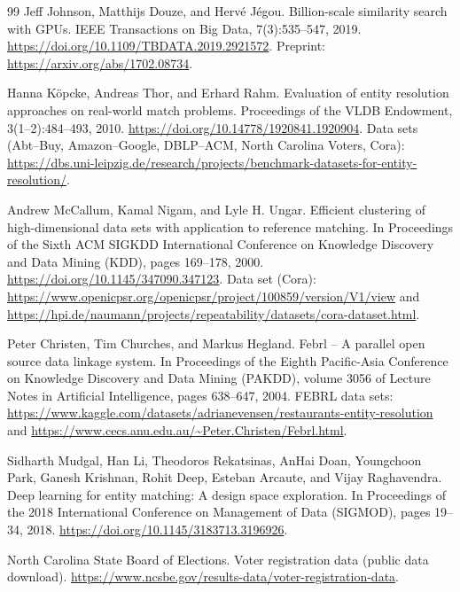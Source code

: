 \documentclass[conference]{IEEEtran}
\begin{document}
\begin{thebibliography}{99}
Jeff Johnson, Matthijs Douze, and Herv\'e J\'egou.
\newblock Billion-scale similarity search with GPUs.
\newblock IEEE Transactions on Big Data, 7(3):535--547, 2019.
\newblock \url{https://doi.org/10.1109/TBDATA.2019.2921572}.
\newblock Preprint: \url{https://arxiv.org/abs/1702.08734}.

Hanna K\"opcke, Andreas Thor, and Erhard Rahm.
\newblock Evaluation of entity resolution approaches on real-world match problems.
\newblock Proceedings of the VLDB Endowment, 3(1--2):484--493, 2010.
\newblock \url{https://doi.org/10.14778/1920841.1920904}.
\newblock Data sets (Abt--Buy, Amazon--Google, DBLP--ACM, North Carolina Voters, Cora): \url{https://dbs.uni-leipzig.de/research/projects/benchmark-datasets-for-entity-resolution/}.

Andrew McCallum, Kamal Nigam, and Lyle H. Ungar.
\newblock Efficient clustering of high-dimensional data sets with application to reference matching.
\newblock In Proceedings of the Sixth ACM SIGKDD International Conference on Knowledge Discovery and Data Mining (KDD), pages 169--178, 2000.
\newblock \url{https://doi.org/10.1145/347090.347123}.
\newblock Data set (Cora): \url{https://www.openicpsr.org/openicpsr/project/100859/version/V1/view} and \url{https://hpi.de/naumann/projects/repeatability/datasets/cora-dataset.html}.

Peter Christen, Tim Churches, and Markus Hegland.
\newblock Febrl -- A parallel open source data linkage system.
\newblock In Proceedings of the Eighth Pacific-Asia Conference on Knowledge Discovery and Data Mining (PAKDD), volume 3056 of Lecture Notes in Artificial Intelligence, pages 638--647, 2004.
\newblock FEBRL data sets: \url{https://www.kaggle.com/datasets/adrianevensen/restaurants-entity-resolution} and \url{https://www.cecs.anu.edu.au/~Peter.Christen/Febrl.html}.

Sidharth Mudgal, Han Li, Theodoros Rekatsinas, AnHai Doan, Youngchoon Park, Ganesh Krishnan, Rohit Deep, Esteban Arcaute, and Vijay Raghavendra.
\newblock Deep learning for entity matching: A design space exploration.
\newblock In Proceedings of the 2018 International Conference on Management of Data (SIGMOD), pages 19--34, 2018.
\newblock \url{https://doi.org/10.1145/3183713.3196926}.

North Carolina State Board of Elections.
\newblock Voter registration data (public data download).
\newblock \url{https://www.ncsbe.gov/results-data/voter-registration-data}.


\end{thebibliography}
\end{document}
